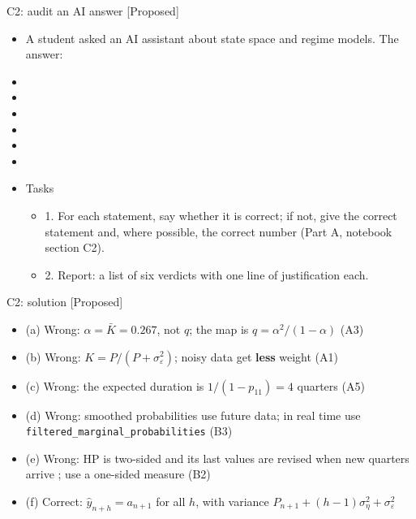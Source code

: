 \begin{frame}{C2: audit an AI answer [Proposed]}
\itemsize{\scriptsize}
\begin{itemize}
    \item A student asked an AI assistant about state space and regime models. The answer:
    \item {}
    \item {}
    \item {}
    \item {}
    \item {}
    \item {}
    \item Tasks
    \begin{itemize}
        \item 1. For each statement, say whether it is correct; if not, give the correct statement and, where possible, the correct number (Part A, notebook section C2).
        \item 2. Report: a list of six verdicts with one line of justification each.
    \end{itemize}
\end{itemize}
\end{frame}

\ifsolutions
\begin{frame}{C2: solution [Proposed]}
\itemsize{\scriptsize}
\begin{itemize}
    \item (a) Wrong: $\alpha = \bar K = 0.267$, not $q$; the map is $q = \alpha^2/(1 - \alpha)$ (A3)
    \item (b) Wrong: $K = P/(P + \sigma^2_\varepsilon)$; noisy data get \textbf{less} weight (A1)
    \item (c) Wrong: the expected duration is $1/(1 - p_{11}) = 4$ quarters (A5)
    \item (d) Wrong: smoothed probabilities use future data; in real time use \texttt{filtered\_marginal\_probabilities} (B3)
    \item (e) Wrong: HP is two-sided and its last values are revised when new quarters arrive ; use a one-sided measure (B2)
    \item (f) Correct: $\hat y_{n+h} = a_{n+1}$ for all $h$, with variance $P_{n+1} + (h - 1)\sigma^2_\eta + \sigma^2_\varepsilon$
\end{itemize}
\end{frame}
\fi


